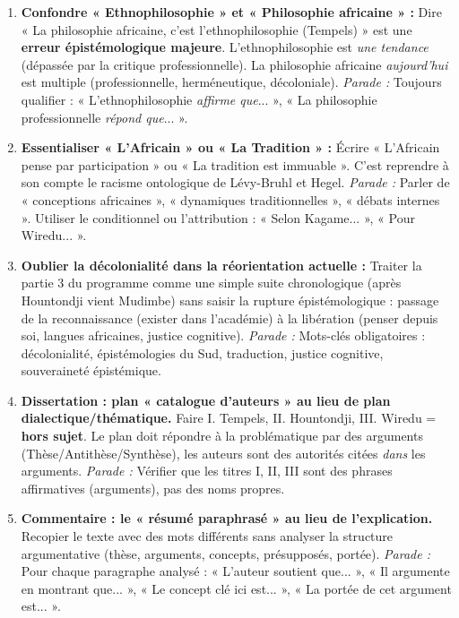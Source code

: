 \documentclass[11pt]{article}
\newcommand{\cle}[1]{{\popxbold\color{popdark}#1}}
\begin{document}
\begin{attention}
\begin{enumerate}
    \item \textbf{Confondre « Ethnophilosophie » et « Philosophie africaine » :} Dire « La philosophie africaine, c'est l'ethnophilosophie (Tempels) » est une \textbf{erreur épistémologique majeure}. L'ethnophilosophie est \emph{une tendance} (dépassée par la critique professionnelle). La philosophie africaine \emph{aujourd'hui} est multiple (professionnelle, herméneutique, décoloniale). \textit{Parade :} Toujours qualifier : « L'ethnophilosophie \emph{affirme que}... », « La philosophie professionnelle \emph{répond que}... ».
    \item \textbf{Essentialiser « L'Africain » ou « La Tradition » :} Écrire « L'Africain pense par participation » ou « La tradition est immuable ». C'est reprendre à son compte le \cle{racisme ontologique} de Lévy-Bruhl et Hegel. \textit{Parade :} Parler de « \cle{conceptions} africaines », « \cle{dynamiques} traditionnelles », « \cle{débats} internes ». Utiliser le conditionnel ou l'attribution : « Selon Kagame... », « Pour Wiredu... ».
    \item \textbf{Oublier la \cle{décolonialité} dans la réorientation actuelle :} Traiter la partie 3 du programme comme une simple suite chronologique (après Hountondji vient Mudimbe) sans saisir la \cle{rupture épistémologique} : passage de la \cle{reconnaissance} (exister dans l'académie) à la \cle{libération} (penser depuis soi, langues africaines, justice cognitive). \textit{Parade :} Mots-clés obligatoires : \cle{décolonialité}, \cle{épistémologies du Sud}, \cle{traduction}, \cle{justice cognitive}, \cle{souveraineté épistémique}.
    \item \textbf{Dissertation : plan « catalogue d'auteurs » au lieu de plan \cle{dialectique/thématique}.} Faire I. Tempels, II. Hountondji, III. Wiredu = \textbf{hors sujet}. Le plan doit répondre à la \cle{problématique} par des \cle{arguments} (Thèse/Antithèse/Synthèse), les auteurs sont des \cle{autorités} citées \emph{dans} les arguments. \textit{Parade :} Vérifier que les titres I, II, III sont des \cle{phrases affirmatives} (arguments), pas des noms propres.
    \item \textbf{Commentaire : le « résumé paraphrasé » au lieu de l'\cle{explication}.} Recopier le texte avec des mots différents sans analyser la \cle{structure argumentative} (thèse, arguments, concepts, présupposés, portée). \textit{Parade :} Pour chaque paragraphe analysé : « L'auteur \cle{soutient} que... », « Il \cle{argumente} en montrant que... », « Le concept clé ici est... », « La portée de cet argument est... ».
\end{enumerate}
\end{attention}
\end{document}
